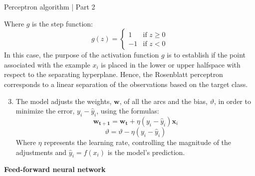 \begin{tcolorbox} [colback=blue!5, colframe=blue!80, boxrule=0pt]
    \begin{algorithm} [H]
    \setcounter{algorithm}{3}
    \caption{Perceptron algorithm | Part 2}
    \addtolength{\leftskip}{2em}
        Where $g$ is the step function: 
        \[
        g(z) = 
        \begin{cases} 
              1 & \text{if } z \geq 0 \\
             -1 & \text{if } z < 0 
        \end{cases}
        \]
        In this case, the purpose of the activation function $g$ is to establish if the point associated with the example $x_i$ is placed in the lower or upper halfspace with respect to the separating hyperplane. Hence, the Rosenblatt perceptron corresponds to a linear separation of the observations based on the target class.
        \begin{enumerate}
        \setcounter{enumi}{2}  %
            \item The model adjusts the weights, $\mathbf{w}$, of all the arcs and the bias, $\vartheta$, in order to minimize the error, $y_i - \hat{y}_i$, using the formulas:
            \[
            \mathbf{w_{t+1}} = \mathbf{w_t} + \eta (y_i - \hat{y}_i) \mathbf{x}_i
            \]
            \[
            \vartheta = \vartheta - \eta (y_i - \hat{y}_i)
            \]
            Where $\eta$ represents the learning rate, controlling the magnitude of the adjustments and $\hat{y}_i = f(x_i)$ is the model's prediction.
        \end{enumerate}
    \end{algorithm}
\end{tcolorbox}

\textbf{Feed-forward neural network}

